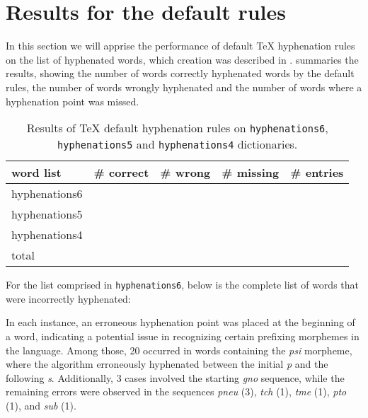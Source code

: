 \section{Results for the default rules}

In this section we will apprise the performance of default \TeX{} hyphenation
rules on the list of hyphenated words, which creation was described in
.  summaries the results, showing
the number of words correctly hyphenated words by the default rules, the number
of words wrongly hyphenated and the number of words where a hyphenation point
was missed.

\begin{table}[htbp]
\centering
\caption{Results of \TeX{} default hyphenation rules on \texttt{hyphenations6}, \texttt{hyphenations5} and \texttt{hyphenations4} dictionaries.}
\label{tab-default-results}
\begin{tabular}{lrrrr}
\toprule
word list 	& \# correct 		& \# wrong 		& \# missing 		& \# entries 		\\
\midrule
hyphenations6 	& \NumberOfCorrectSix{}	& \NumberOfWrongSix{}	& \NumberOfMissingSix{}	& \NumberOfTotalSix{} 	\\
hyphenations5 	& \NumberOfCorrectFive{}& \NumberOfWrongFive{}	& \NumberOfMissingFive{}& \NumberOfTotalFive{} 	\\
hyphenations4 	& \NumberOfCorrectFour{}& \NumberOfWrongFour{}	& \NumberOfMissingFour{}& \NumberOfTotalFour{} 	\\
total		& \NumberOfCorrectSum{} & \NumberOfWrongSum{} 	& \NumberOfMissingSum{}	& \NumberOfTotalSum{}   \\
\bottomrule
\end{tabular}
\end{table}

For the list comprised in \texttt{hyphenations6}, below is the complete list of
\NumberOfWrongSix{} words that were incorrectly hyphenated:
In each instance, an erroneous hyphenation point was placed at the beginning of
a word, indicating a potential issue in recognizing certain prefixing morphemes
in the language.  Among those, 20 occurred in words containing the \emph{psi}
morpheme, where the algorithm erroneously hyphenated between the initial
\emph{p} and the following \emph{s}. Additionally, 3 cases involved the
starting \emph{gno} sequence, while the remaining errors were observed in the
sequences \emph{pneu} (3), \emph{tch} (1), \emph{tme} (1), \emph{pto} (1), and
\emph{sub} (1).

